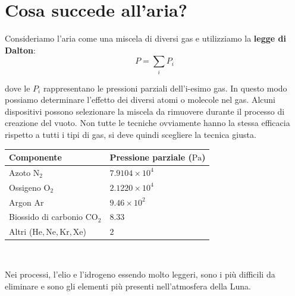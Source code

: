 \section{Cosa succede all'aria?}
Consideriamo l'aria come una miscela di diversi gas e utilizziamo la \textbf{legge di Dalton}:
\begin{equation*}
    P=\sum_i P_i
\end{equation*}

dove le $P_i$ rappresentano le pressioni parziali dell'i-esimo gas. In questo modo possiamo determinare l'effetto dei diversi atomi o molecole nel gas. Alcuni dispositivi possono selezionare la miscela da rimuovere durante il processo di creazione del vuoto. Non tutte le tecniche ovviamente hanno la stessa efficacia rispetto a tutti i tipi di gas, si deve quindi scegliere la tecnica giusta.

\begin{center}
    \begin{tabular}{ll}
        \toprule
        Componente & Pressione parziale ($\text{Pa}$) \\
        \midrule
        Azoto $\text{N}_2$ & $7.9104 \times 10^4$ \\
        Ossigeno $\text{O}_2$ & $ 2.1220 \times 10^4 $ \\
        Argon $\text{Ar}$ & $9.46 \times 10^2$ \\
        Biossido di carbonio $\text{CO}_2$ & $ 8.33 $\\
        Altri ($\text{He},\text{Ne}, \text{Kr}, \text{Xe}$) & $2$ \\
        \bottomrule
    \end{tabular} \\
\end{center}

Nei processi, l'elio e l'idrogeno essendo molto leggeri, sono i più difficili da eliminare e sono gli elementi più presenti nell'atmosfera della Luna.

